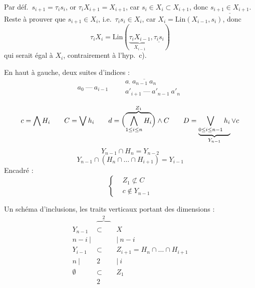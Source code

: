 \documentclass[11pt,a4paper]{article}
\begin{document}
Par déf.\ $s_{i+1} = \tau_i s_i$, or $\tau_i X_{i+1} = X_{i+1}$, car $s_i \in X_i \subset X_{i+1}$, donc $\underline{s_{i+1} \in X_{i+1}}$.   Reste à prouver que $s_{i+1} \in X_i$, i.e.\ $\tau_i s_i \in X_i$, car  $X_i = \mathrm{Lin}(X_{i-1}, s_i)$, donc
\[
\tau_i X_i = \mathrm{Lin}(\underbrace{\tau_i X_{i-1}}_{X_{i-1}}, \underline{\tau_i s_i})
\]
qui serait égal à $X_i$, contrairement à l'hyp.\ c).


En haut à gauche, deux suites d'indices :
\[
a_0 \ \text{---}\ a_{i-1} \qquad \begin{array}{c} a_{\cdot}\ \overline{a_{n-1}\ a_n} \\ a'_{i+1} \ \text{---}\ a'_{n-1}\ a'_n \end{array}
\]

\[
c = \bigwedge H_i \qquad C = \bigvee h_i \qquad d = \Bigl(\overbrace{\bigwedge_{1 \leq i \leq n} H_i}^{Z_1}\Bigr) \wedge C \qquad D = \underbrace{\bigvee_{0 \leq i \leq n-1} h_i}_{Y_{n-1}} \vee c
\]
\[
Y_{n-1} \cap H_n = Y_{n-2}
\]
\[
Y_{n-1} \cap (H_n \cap \dots \cap H_{i+1}) = Y_{i-1}
\]
Encadré :
\[
\left\lbrace
\begin{aligned}
&Z_1 \not\subset C \\
&c \notin Y_{n-1}
\end{aligned}
\right.
\]

Un schéma d'inclusions, les traits verticaux portant des dimensions :
\[
\begin{array}{ccc}
& \overbrace{\qquad}^{2} & \\
Y_{n-1} & \subset & X \\
{\scriptstyle n-i}\ \Big| & & \Big|\ {\scriptstyle n-i} \\
Y_{i-1} & \subset & Z_{i+1} = H_n \cap \dots \cap H_{i+1} \\
{\scriptstyle n}\ \Big| & {\scriptstyle 2} & \Big|\ {\scriptstyle i} \\
\emptyset & \subset & Z_1 \\
& {\scriptstyle 2} &
\end{array}
\]
\end{document}
